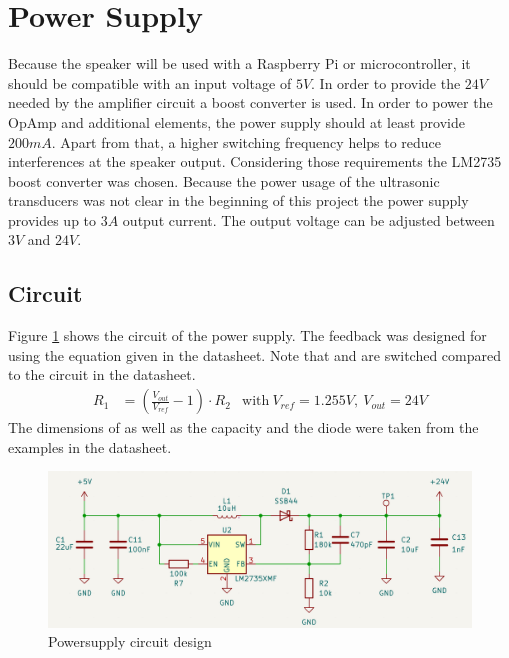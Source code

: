 \section{Power Supply}


Because the speaker will be used with a Raspberry Pi or microcontroller, it should be compatible with an input voltage of $5V$. In order to provide the $24V$ needed by the amplifier circuit a boost converter is used.\p
In order to power the OpAmp and additional elements, the power supply should at least provide $200mA$. Apart from that, a higher switching frequency helps to reduce interferences at the speaker output.\p
%
Considering those requirements the LM2735 boost converter was chosen. Because the power usage of the ultrasonic transducers was not clear in the beginning of this project the power supply provides up to $3A$ output current. The output voltage can be adjusted between $3V$ and $24V$.\cite{texas_instruments_lm2735-q1_2018}

\subsection{Circuit}

Figure \ref{fig:pcb:power_circuit} shows the circuit of the power supply. The feedback was designed for using the equation given in the datasheet.
Note that  and  are switched compared to the circuit in the datasheet.
%
\begin{align}
  R_1 &= \left(\frac{V_{out}}{V_{ref}} - 1\right) \cdot R_2
  &\mathrm{with~} V_{ref} = 1.255V,~V_{out} = 24V
\end{align}
%
The dimensions of  as well as the capacity  and the diode  were taken from the examples in the datasheet.
%
\begin{figure}
  \centering
  \includegraphics[width=\textwidth]{src/assets/pictures/circuit/powersupply_circuit.png}
  \caption{Powersupply circuit design}\label{fig:pcb:power_circuit}
\end{figure}